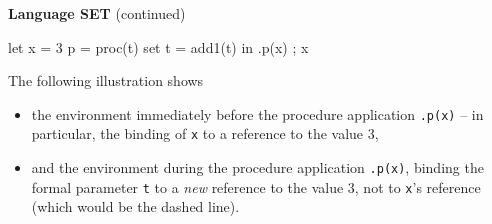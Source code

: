 \begin{minipage}[t]{\sw}
\slidenumber
\LARGE
{\bf Language SET} (continued)
\begin{qv}
let
  x = 3
  p = proc(t) set t = add1(t)
in
  { .p(x) ; x }
\end{qv}
The following illustration shows
\begin{itemize}
\item
the environment immediately before
the procedure application \verb'.p(x)' --
in particular, the binding of \verb'x' to a reference to the value 3,
\item
and the environment during the procedure application \verb'.p(x)',
binding the formal parameter \verb't'
to a {\em new} reference to the value 3,
not to \verb'x''s reference (which would be the dashed line).
\end{itemize}
\end{minipage}

